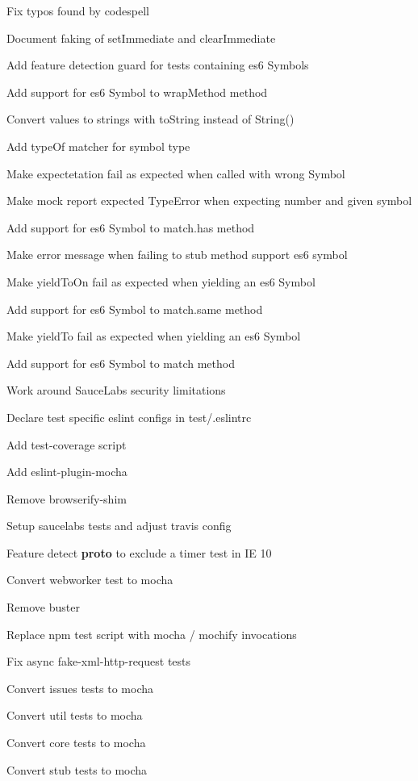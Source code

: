 \begin{DoxyItemize}
\item Fix typos found by codespell
\item Document faking of set\+Immediate and clear\+Immediate
\item Add feature detection guard for tests containing es6 Symbols
\item Add support for es6 Symbol to wrap\+Method method
\item Convert values to strings with to\+String instead of String()
\item Add type\+Of matcher for symbol type
\item Make expectetation fail as expected when called with wrong Symbol
\item Make mock report expected Type\+Error when expecting number and given symbol
\item Add support for es6 Symbol to match.\+has method
\item Make error message when failing to stub method support es6 symbol
\item Make yield\+To\+On fail as expected when yielding an es6 Symbol
\item Add support for es6 Symbol to match.\+same method
\item Make yield\+To fail as expected when yielding an es6 Symbol
\item Add support for es6 Symbol to match method
\item Work around Sauce\+Labs security limitations
\item Declare test specific eslint configs in test/.eslintrc
\item Add test-\/coverage script
\item Add eslint-\/plugin-\/mocha
\item Remove browserify-\/shim
\item Setup saucelabs tests and adjust travis config
\item Feature detect {\bfseries proto} to exclude a timer test in IE 10
\item Convert webworker test to mocha
\item Remove buster
\item Replace npm test script with mocha / mochify invocations
\item Fix async fake-\/xml-\/http-\/request tests
\item Convert issues tests to mocha
\item Convert util tests to mocha
\item Convert core tests to mocha
\item Convert stub tests to mocha

\end{DoxyItemize}
